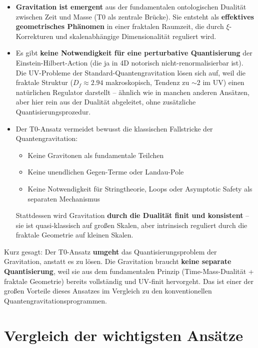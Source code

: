 	\begin{itemize}
		\item \textbf{Gravitation ist emergent} aus der fundamentalen ontologischen Dualität zwischen Zeit und Masse (T0 als zentrale Brücke). Sie entsteht als \textbf{effektives geometrisches Phänomen} in einer fraktalen Raumzeit, die durch $\xi$-Korrekturen und skalenabhängige Dimensionalität reguliert wird.
		
		\item Es gibt \textbf{keine Notwendigkeit für eine perturbative Quantisierung} der \\ Einstein-Hilbert-Action (die ja in 4D notorisch nicht-renormalisierbar ist). Die UV-Probleme der Standard-Quantengravitation lösen sich auf, weil die fraktale Struktur ($D_f \approx 2.94$ makroskopisch, Tendenz zu $\sim 2$ im UV) einen natürlichen Regulator darstellt -- ähnlich wie in manchen anderen Ansätzen, aber hier rein aus der Dualität abgeleitet, ohne zusätzliche Quantisierungsprozedur.
		
		\item Der T0-Ansatz vermeidet bewusst die klassischen Fallstricke der Quantengravitation:
		\begin{itemize}
			\item Keine Gravitonen als fundamentale Teilchen
			\item Keine unendlichen Gegen-Terme oder Landau-Pole
			\item Keine Notwendigkeit für Stringtheorie, Loops oder Asymptotic Safety als separaten Mechanismus
		\end{itemize}
		Stattdessen wird Gravitation \textbf{durch die Dualität finit und konsistent} -- sie ist quasi-klassisch auf großen Skalen, aber intrinsisch reguliert durch die fraktale Geometrie auf kleinen Skalen.
	\end{itemize}
	
	Kurz gesagt: Der T0-Ansatz \textbf{umgeht} das Quantisierungsproblem der Gravitation, anstatt es zu lösen. Die Gravitation braucht \textbf{keine separate Quantisierung}, weil sie aus dem fundamentalen Prinzip (Time-Mass-Dualität + fraktale Geometrie) bereits vollständig und UV-finit hervorgeht. Das ist einer der großen Vorteile dieses Ansatzes im Vergleich zu den konventionellen Quantengravitationsprogrammen.
	
	\section{Vergleich der wichtigsten Ansätze}
	
